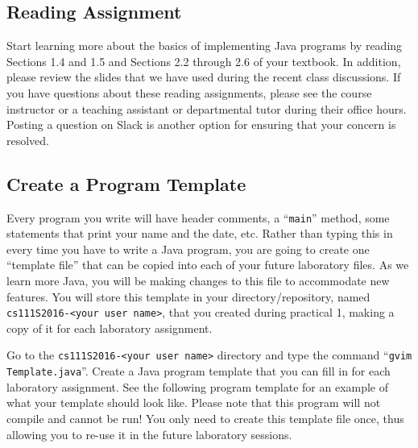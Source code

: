 \subsection*{Reading Assignment}

Start learning more about the basics of implementing Java programs by reading Sections 1.4 and 1.5 and Sections 2.2
through 2.6 of your textbook. In addition, please review the slides that we have used during the recent class
discussions. If you have questions about these reading assignments, please see the course instructor or a teaching
assistant or departmental tutor during their office hours. Posting a question on Slack is another option for ensuring
that your concern is resolved.

\vspace*{-.15in}

\subsection*{Create a Program Template}

Every program you write will have header comments, a ``{\tt main}'' method, some statements that print your name and the
date, etc. Rather than typing this in every time you have to write a Java program, you are going to create one
``template file'' that can be copied into each of your future laboratory files. As we learn more Java, you will be
making changes to this file to accommodate new features. You will store this template in your directory/repository,
named {\tt cs111S2016-<your user name>}, that you created during practical 1, making a copy of it for each laboratory
assignment.

\begin{sloppypar} Go to the {\tt cs111S2016-<your user name>} directory and type the command ``{\tt gvim
  Template.java}''.  Create a Java program template that you can fill in for each laboratory assignment.  See the
  following program template for an example of what your template should look like.  Please note that this program will not
  compile and cannot be run!  You only need to create this template file once, thus allowing you to re-use it in the
future laboratory sessions.  \end{sloppypar}

